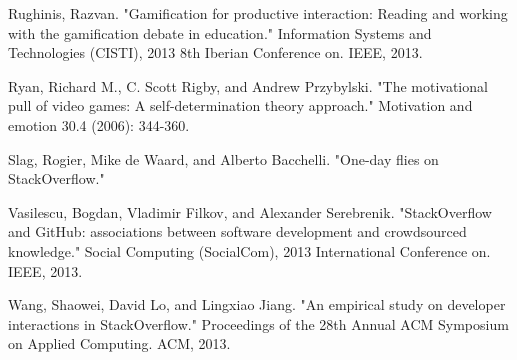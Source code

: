\documentclass{sigchi}
\begin{document}
\begin{thebibliography}{9}
Rughinis, Razvan. "Gamification for productive interaction: Reading and working with the gamification debate in education." Information Systems and Technologies (CISTI), 2013 8th Iberian Conference on. IEEE, 2013.

Ryan, Richard M., C. Scott Rigby, and Andrew Przybylski. "The motivational pull of video games: A self-determination theory approach." Motivation and emotion 30.4 (2006): 344-360.

Slag, Rogier, Mike de Waard, and Alberto Bacchelli. "One-day flies on StackOverflow."

Vasilescu, Bogdan, Vladimir Filkov, and Alexander Serebrenik. "StackOverflow and GitHub: associations between software development and crowdsourced knowledge." Social Computing (SocialCom), 2013 International Conference on. IEEE, 2013.

Wang, Shaowei, David Lo, and Lingxiao Jiang. "An empirical study on developer interactions in StackOverflow." Proceedings of the 28th Annual ACM Symposium on Applied Computing. ACM, 2013.


\end{thebibliography}
\end{document}
